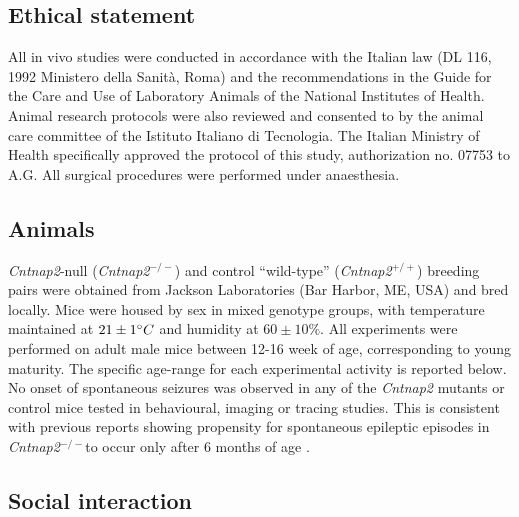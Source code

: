 \subsection {Ethical statement}

All in vivo studies were conducted in accordance with the Italian law (DL 116,
1992 Ministero della Sanità, Roma) and the recommendations in the Guide for the
Care and Use of Laboratory Animals of the National Institutes of Health. Animal
research protocols were also reviewed and consented to by the animal care
committee of the Istituto Italiano di Tecnologia. The Italian Ministry of Health
specifically approved the protocol of this study, authorization no. 07753 to A.G.
All surgical procedures were performed under anaesthesia.

\subsection{Animals}

\textit{Cntnap2}-null (\textit{Cntnap2}$^{-/-}$) and control “wild-type” (\textit{Cntnap2}$^{+/+}$) breeding pairs
were obtained from Jackson Laboratories (Bar Harbor, ME, USA) and bred locally.
Mice were housed by sex in mixed genotype groups, with temperature maintained at
$21 \pm 1\degree C$ and humidity at $60 \pm 10 \%$. All experiments were
performed on adult male mice between 12-16 week of age, corresponding to young
maturity. The specific age-range for each experimental activity is reported
below. No onset of spontaneous seizures was observed in any of the \textit{Cntnap2}
mutants or control mice tested in behavioural, imaging or tracing studies. This
is consistent with previous reports showing propensity for spontaneous epileptic
episodes in \textit{Cntnap2}$^{-/-}$to occur only after 6 months of age
\parencite{penagarikano2011}.

\subsection{Social interaction}

